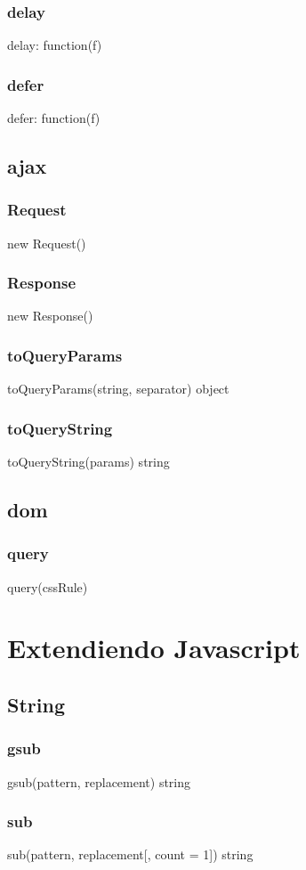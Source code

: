 \subsubsection*{delay}
delay: function(f) {
\subsubsection*{defer}
defer: function(f) {

\subsection{ajax}
\subsubsection*{Request}
new Request()
\subsubsection*{Response}
new Response()
\subsubsection*{toQueryParams}
toQueryParams(string, separator) \rightarrow object
\subsubsection*{toQueryString}
toQueryString(params) \rightarrow string

\subsection{dom}
\subsubsection*{query}
query(cssRule) \rightarrow [HTMLElement...]

\section{Extendiendo Javascript}
\subsection{String}
\subsubsection*{gsub}
gsub(pattern, replacement) \rightarrow string
\subsubsection*{sub}
sub(pattern, replacement[, count = 1]) \rightarrow string
}}
